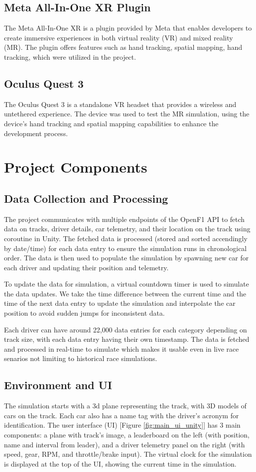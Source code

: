 \documentclass[
	a4paper, %
	10pt, %
	unnumberedsections, %
	twoside, %
]{LTJournalArticle}
\begin{document}
\subsection{Meta All-In-One XR Plugin}
The Meta All-In-One XR is a plugin provided by Meta that enables developers to create immersive experiences in both virtual reality (VR) and mixed reality (MR). The plugin offers 
features such as hand tracking, spatial mapping, hand tracking, which were utilized in the project.

\subsection{Oculus Quest 3}
The Oculus Quest 3 is a standalone VR headset that provides a wireless and untethered experience. The device was used to test the MR simulation, using the device's hand tracking 
and spatial mapping capabilities to enhance the development process.

\section{Project Components}
\subsection{Data Collection and Processing}
The project communicates with multiple endpoints of the OpenF1 API to fetch data on tracks, driver details, car telemetry, and their location on the track using coroutine in Unity. 
The fetched data is processed (stored and sorted accendingly by date/time) for each data entry to ensure the simulation runs in chronological order. The data is then used to populate 
the simulation by spawning new car for each driver and updating their position and telemetry.

To update the data for simulation, a virtual countdown timer is used to simulate the data updates. We take the time difference between the current time and the time of the next data 
entry to update the simulation and interpolate the car position to avoid sudden jumps for inconsistent data.

Each driver can have around 22,000 data entries for each category depending on track size, with each data entry having their own timestamp. The data is fetched and processed in 
real-time to simulate which makes it usable even in live race senarios not limiting to historical race simulations.

\subsection{Environment and UI}
The simulation starts with a 3d plane representing the track, with 3D models of cars on the track. Each car also has a name tag with the driver's acronym for identification. 
The user interface (UI) [Figure \ref{fig:main_ui_unity}] has 3 main components: a plane with track's image, a leaderboard on the left (with position, name and interval from leader), 
and a driver telemetry panel on the right (with speed, gear, RPM, and throttle/brake input). The virtual clock for the simulation is displayed at the top of the UI, showing the current time in the simulation.
\end{document}
